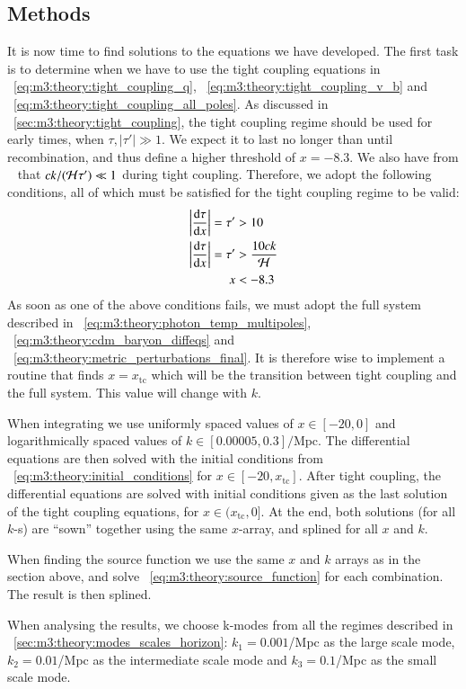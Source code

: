 \subsection{Methods}\label{sec:m3:methods}

    It is now time to find solutions to the equations we have developed. The first task is to determine when we have to use the tight coupling equations in ~\cref{eq:m3:theory:tight_coupling_q}, ~\cref{eq:m3:theory:tight_coupling_v_b} and ~\cref{eq:m3:theory:tight_coupling_all_poles}. As discussed in ~\cref{sec:m3:theory:tight_coupling}, the tight coupling regime should be used for early times, when $\tau, |\tau'| \gg1$. We expect it to last no longer than until recombination, and thus define a higher threshold of $x=-8.3$. We also have from ~\cite{https://doi.org/10.48550/arxiv.astro-ph/0606683} that $ck/(\mathcal{H}\tau')\ll1$ during tight coupling. Therefore, we adopt the following conditions, all of which must be satisfied for the tight coupling regime to be valid:
    \begin{equation}
        \begin{split}
            \abs{\dv{\tau}{x}} = \tau' &> 10 \\
            \abs{\dv{\tau}{x}} = \tau' &> \frac{10ck}{\mathcal{H}} \\
            x &< -8.3
        \end{split}
    \end{equation}
    As soon as one of the above conditions fails, we must adopt the full system described in ~\cref{eq:m3:theory:photon_temp_multipoles}, ~\cref{eq:m3:theory:cdm_baryon_diffeqs} and ~\cref{eq:m3:theory:metric_perturbations_final}. It is therefore wise to implement a routine that finds $x=x_\mathrm{tc}$ which will be the transition between tight coupling and the full system. This value will change with $k$. 

    When integrating we use uniformly spaced values of $x\in[-20,0]$ and logarithmically spaced values of $k\in[0.00005, 0.3]/\mathrm{Mpc}$. The differential equations are then solved with the initial conditions from ~\cref{eq:m3:theory:initial_conditions} for $x\in[-20,x_\mathrm{tc}]$. After tight coupling, the differential equations are solved with initial conditions given as the last solution of the tight coupling equations, for $x\in(x_\mathrm{tc},0]$. At the end, both solutions (for all $k$-s) are ``sown'' together using the same $x$-array, and splined for all $x$ and $k$. 

    When finding the source function we use the same $x$ and $k$ arrays as in the section above, and solve ~\cref{eq:m3:theory:source_function} for each combination. The result is then splined. 

    When analysing the results, we choose k-modes from all the regimes described in ~\cref{sec:m3:theory:modes_scales_horizon}: $k_1=0.001$/Mpc as the large scale mode, $k_2=0.01$/Mpc as the intermediate scale mode and $k_3=0.1$/Mpc as the small scale mode. 